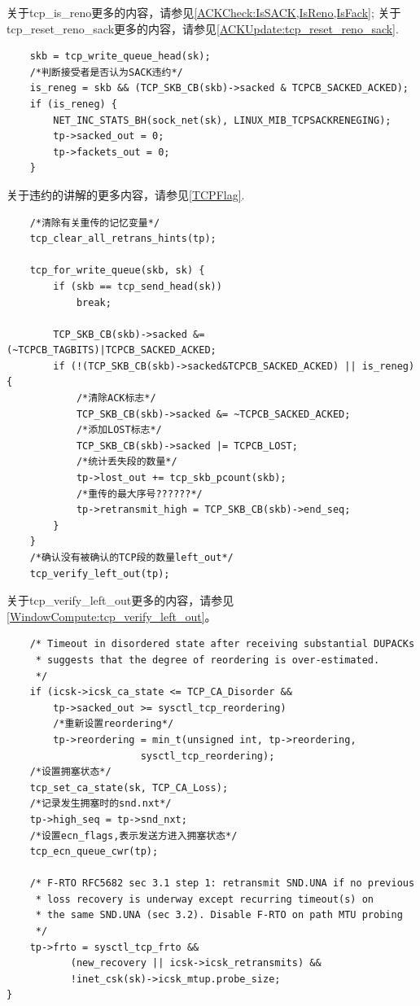     关于tcp\_is\_reno更多的内容，请参见\ref{ACKCheck:IsSACK,IsReno,IsFack};
    关于tcp\_reset\_reno\_sack更多的内容，请参见\ref{ACKUpdate:tcp_reset_reno_sack}.

\begin{verbatim}
    skb = tcp_write_queue_head(sk);
    /*判断接受者是否认为SACK违约*/
    is_reneg = skb && (TCP_SKB_CB(skb)->sacked & TCPCB_SACKED_ACKED);
    if (is_reneg) {
        NET_INC_STATS_BH(sock_net(sk), LINUX_MIB_TCPSACKRENEGING);
        tp->sacked_out = 0;
        tp->fackets_out = 0;
    }
\end{verbatim}

    关于违约的讲解的更多内容，请参见\ref{TCPFlag}.
\begin{verbatim}
    /*清除有关重传的记忆变量*/
    tcp_clear_all_retrans_hints(tp);

    tcp_for_write_queue(skb, sk) {
        if (skb == tcp_send_head(sk))
            break;

        TCP_SKB_CB(skb)->sacked &= (~TCPCB_TAGBITS)|TCPCB_SACKED_ACKED;
        if (!(TCP_SKB_CB(skb)->sacked&TCPCB_SACKED_ACKED) || is_reneg) {
            /*清除ACK标志*/
            TCP_SKB_CB(skb)->sacked &= ~TCPCB_SACKED_ACKED;
            /*添加LOST标志*/            
            TCP_SKB_CB(skb)->sacked |= TCPCB_LOST;
            /*统计丢失段的数量*/            
            tp->lost_out += tcp_skb_pcount(skb);
            /*重传的最大序号??????*/
            tp->retransmit_high = TCP_SKB_CB(skb)->end_seq;
        }
    }
    /*确认没有被确认的TCP段的数量left_out*/
    tcp_verify_left_out(tp);
\end{verbatim}

    关于tcp\_verify\_left\_out更多的内容，请参见\ref{WindowCompute:tcp_verify_left_out}。
    
\begin{verbatim}
    /* Timeout in disordered state after receiving substantial DUPACKs
     * suggests that the degree of reordering is over-estimated.
     */
    if (icsk->icsk_ca_state <= TCP_CA_Disorder &&
        tp->sacked_out >= sysctl_tcp_reordering)
        /*重新设置reordering*/
        tp->reordering = min_t(unsigned int, tp->reordering,
                       sysctl_tcp_reordering);
    /*设置拥塞状态*/    
    tcp_set_ca_state(sk, TCP_CA_Loss);
    /*记录发生拥塞时的snd.nxt*/
    tp->high_seq = tp->snd_nxt;
    /*设置ecn_flags,表示发送方进入拥塞状态*/    
    tcp_ecn_queue_cwr(tp);

    /* F-RTO RFC5682 sec 3.1 step 1: retransmit SND.UNA if no previous
     * loss recovery is underway except recurring timeout(s) on
     * the same SND.UNA (sec 3.2). Disable F-RTO on path MTU probing
     */
    tp->frto = sysctl_tcp_frto &&
           (new_recovery || icsk->icsk_retransmits) &&
           !inet_csk(sk)->icsk_mtup.probe_size;
}
\end{verbatim}

